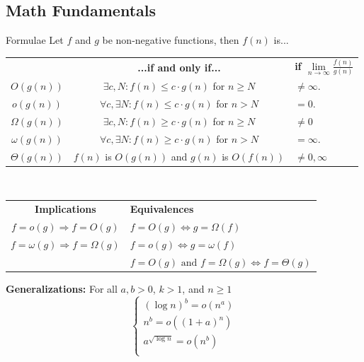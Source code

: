 \documentclass[10pt,a4paper]{article}
\begin{document}
\small
\begin{multicols}{3}

\scriptsize

\section{Math Fundamentals}
\begin{textbox}{Formulae}
 Let $f$ and $g$ be non-negative functions, then $f(n)$ is...\\

\begin{tabular}{c|c|p{}}
     & {\bf...if and only if...} & {\bf if $\lim\limits_{n \to \infty} \frac{f(n)}{g(n)}$}  \\
    $O(g(n))$ & $\exists c,N:f(n)\leq c\cdot g(n)$ for $n\geq N$ & $\neq \infty$.  \\
    $o(g(n))$ & $\forall c,\exists N:f(n)\leq c\cdot g(n)$ for $n>N$ & $= 0$. \\
    $\Omega(g(n))$ & $\exists c,N:f(n)\geq c\cdot g(n)$ for $n\geq N$ & $\neq 0$\\
    $\omega(g(n))$ & $\forall c,\exists N:f(n)\geq c\cdot g(n)$ for $n>N$ & $= \infty$. \\
    $\Theta(g(n))$ & $f(n)$ is $O(g(n))$ and $g(n)$ is $O(f(n))$ & $\neq 0, \infty$ \\
\end{tabular}\\
\linebreak
\begin{tabular}{c|p{}}
    {\bf Implications} &  {\bf Equivalences} \\
    $f = o(g) \Rightarrow f = O(g)$ & $f = O(g) \Leftrightarrow g = \Omega(f)$ \\
    $f = \omega(g) \Rightarrow f = \Omega(g)$ & $f = o(g) \Leftrightarrow g = \omega(f)$ \\
     & $f = O(g) \text{ and } f = \Omega(g) \Leftrightarrow f = \Theta(g)$ \\
\end{tabular}
\linebreak
{\bf Generalizations:} For all $a, b > 0$, $k > 1$, and $n \geq 1$ 
\[\begin{cases}
    (\log n)^b = o(n^a)\\
    n^b = o((1 + a)^n) \\
    a^{\sqrt{\log n}} = o(n^b) \\

\end{cases}\]
\end{textbox}
\end{multicols}
\end{document}
